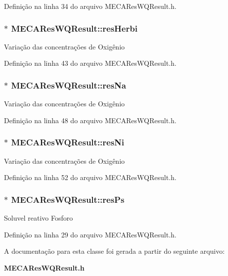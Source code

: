 Definição na linha 34 do arquivo M\+E\+C\+A\+Res\+W\+Q\+Result.\+h.

\subsubsection[{res\+Herbi}]{$\ast$ M\+E\+C\+A\+Res\+W\+Q\+Result\+::res\+Herbi}\label{class_m_e_c_a_res_w_q_result_affbf28deea35c9650d4350b3e5658d0e}
Variação das concentrações de Oxigênio 

Definição na linha 43 do arquivo M\+E\+C\+A\+Res\+W\+Q\+Result.\+h.

\subsubsection[{res\+Na}]{$\ast$ M\+E\+C\+A\+Res\+W\+Q\+Result\+::res\+Na}\label{class_m_e_c_a_res_w_q_result_a3a44eb3fd8642708437bf5a80c0212d7}
Variação das concentrações de Oxigênio 

Definição na linha 48 do arquivo M\+E\+C\+A\+Res\+W\+Q\+Result.\+h.

\subsubsection[{res\+Ni}]{$\ast$ M\+E\+C\+A\+Res\+W\+Q\+Result\+::res\+Ni}\label{class_m_e_c_a_res_w_q_result_afff4e8f0c0fb97e50b2ec33c8605323c}
Variação das concentrações de Oxigênio 

Definição na linha 52 do arquivo M\+E\+C\+A\+Res\+W\+Q\+Result.\+h.

\subsubsection[{res\+Ps}]{$\ast$ M\+E\+C\+A\+Res\+W\+Q\+Result\+::res\+Ps}\label{class_m_e_c_a_res_w_q_result_a1201864725012fbd49fcec4f87a21b0e}
Soluvel reativo Fosforo 

Definição na linha 29 do arquivo M\+E\+C\+A\+Res\+W\+Q\+Result.\+h.



A documentação para esta classe foi gerada a partir do seguinte arquivo\+:\begin{DoxyCompactItemize}
\item 
{\bf M\+E\+C\+A\+Res\+W\+Q\+Result.\+h}\end{DoxyCompactItemize}
